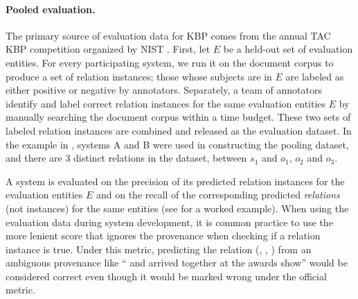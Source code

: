 \paragraph{Pooled evaluation.}

The primary source of evaluation data for KBP comes from the annual TAC KBP competition organized by NIST \citep{ji2011kbp}.
First, let $E$ be a held-out set of evaluation entities.
For every participating system, we run it on the document corpus to produce a set of relation instances;
those whose subjects are in $E$ are labeled as either positive or negative by annotators.
Separately, a team of annotators identify and label correct relation instances for the same evaluation entities $E$ by manually searching the document corpus within a time budget.
These two sets of labeled relation instances are combined and released as the evaluation dataset.
In the example in , systems A and B were used in constructing the pooling dataset, and there are 3 distinct relations in the dataset, between $s_1$ and $o_1$, $o_2$ and $o_3$.

A system is evaluated on the precision of its predicted relation instances for the evaluation entities $E$ and on the recall of the corresponding predicted \textit{relations} (not instances) for the same entities (see  for a worked example).
When using the evaluation data during system development, it is common practice to use the more lenient \anydoc{} score that ignores the provenance when checking if a relation instance is true.
Under this metric, predicting the relation (, , ) from an ambiguous provenance like `` and  arrived together at the awards show'' would be considered correct even though it would be marked wrong under the official metric.



